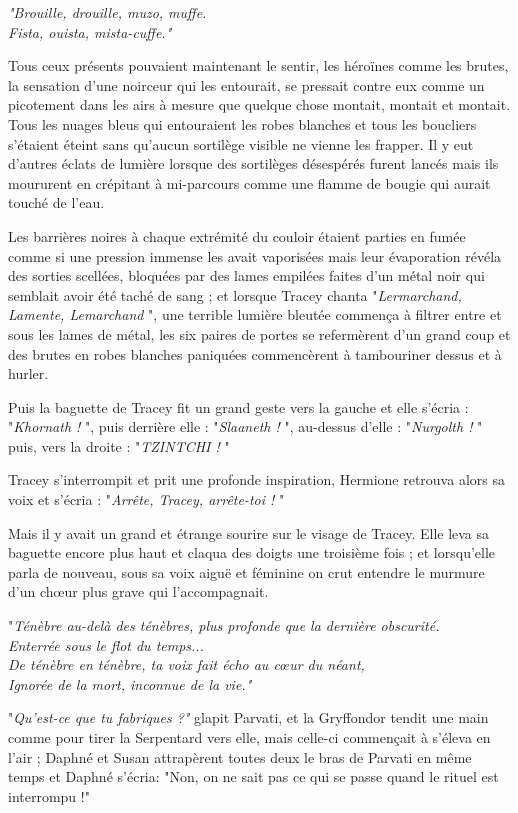 \emph{"Brouille, drouille, muzo, muffe.} \\\emph{} \emph{Fista, ouista, mista-cuffe."} 

Tous ceux présents pouvaient maintenant le sentir, les héroïnes comme les brutes, la sensation d'une noirceur qui les entourait, se pressait contre eux comme un picotement dans les airs à mesure que quelque chose montait, montait et montait. Tous les nuages bleus qui entouraient les robes blanches et tous les boucliers s'étaient éteint sans qu'aucun sortilège visible ne vienne les frapper. Il y eut d'autres éclats de lumière lorsque des sortilèges désespérés furent lancés mais ils moururent en crépitant à mi-parcours comme une flamme de bougie qui aurait touché de l'eau.

Les barrières noires à chaque extrémité du couloir étaient parties en fumée comme si une pression immense les avait vaporisées mais leur évaporation révéla des sorties scellées, bloquées par des lames empilées faites d'un métal noir qui semblait avoir été taché de sang ; et lorsque Tracey chanta "\emph{Lermarchand, Lamente, Lemarchand} ", une terrible lumière bleutée commença à filtrer entre et sous les lames de métal, les six paires de portes se refermèrent d'un grand coup et des brutes en robes blanches paniquées commencèrent à tambouriner dessus et à hurler.

Puis la baguette de Tracey fit un grand geste vers la gauche et elle s'écria : "\emph{Khornath !} ", puis derrière elle : "\emph{Slaaneth !} ", au-dessus d'elle : "\emph{Nurgolth !} " puis, vers la droite : "\emph{TZINTCHI !} "

Tracey s'interrompit et prit une profonde inspiration, Hermione retrouva alors sa voix et s'écria : "\emph{Arrête, Tracey, arrête-toi !} "

Mais il y avait un grand et étrange sourire sur le visage de Tracey. Elle leva sa baguette encore plus haut et claqua des doigts une troisième fois ; et lorsqu'elle parla de nouveau, sous sa voix aiguë et féminine on crut entendre le murmure d'un chœur plus grave qui l'accompagnait.

"\emph{Ténèbre au-delà des ténèbres, plus profonde que la dernière obscurité.} \\\emph{} \emph{Enterrée sous le flot du temps...} \\\emph{} \emph{De ténèbre en ténèbre, ta voix fait écho au cœur du néant,} \\\emph{} \emph{Ignorée de la mort, inconnue de la vie."} 

"\emph{Qu'est-ce que tu fabriques ?"}  glapit Parvati, et la Gryffondor tendit une main comme pour tirer la Serpentard vers elle, mais celle-ci commençait à s'éleva en l'air ; Daphné et Susan attrapèrent toutes deux le bras de Parvati en même temps et Daphné s'écria: "Non, on ne sait pas ce qui se passe quand le rituel est interrompu !"

